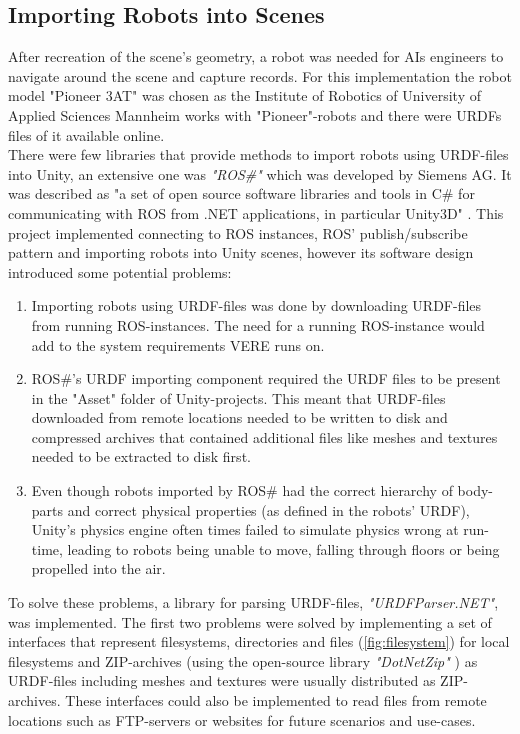 \subsection{Importing Robots into Scenes}
After recreation of the scene's geometry, a robot was needed for \acp{AI} engineers to navigate around the scene and capture records. For this implementation the robot model "Pioneer 3AT" was chosen as the Institute of Robotics of University of Applied Sciences Mannheim works with "Pioneer"-robots and there were \acp{URDF} files of it available \cite{AmrRosConfig} online.\\
There were few libraries that provide methods to import robots using URDF-files into Unity, an extensive one was \textit{"ROS\#"} which was developed by Siemens AG. It was described as "a set of open source software libraries and tools in C\# for communicating with ROS from .NET applications, in particular Unity3D" \cite{RosSharp}. This project implemented connecting to ROS instances, ROS' publish/subscribe pattern and importing robots into Unity scenes, however its software design introduced some potential problems: 
\begin{enumerate}
    \item Importing robots using URDF-files was done by downloading URDF-files from running ROS-instances. The need for a running ROS-instance would add to the system requirements VERE runs on.
    \item ROS\#'s URDF importing component required the URDF files to be present in the "Asset" folder of Unity-projects. This meant that URDF-files downloaded from remote locations needed to be written to disk and compressed archives that contained additional files like meshes and textures needed to be extracted to disk first.
    \item Even though robots imported by ROS\# had the correct hierarchy of body-parts and correct physical properties (as defined in the robots' URDF), Unity's physics engine often times failed to simulate physics wrong at run-time, leading to robots being unable to move, falling through floors or being propelled into the air.
\end{enumerate}
To solve these problems, a library for parsing URDF-files, \textit{"URDFParser.NET"}, was implemented. The first two problems were solved by implementing a set of interfaces that represent filesystems, directories and files (\ref{fig:filesystem}) for local filesystems and ZIP-archives (using the open-source library \textit{"DotNetZip"} \cite{DotNetZip}) as URDF-files including meshes and textures were usually distributed as ZIP-archives. These interfaces could also be implemented to read files from remote locations such as FTP-servers or websites for future scenarios and use-cases.
